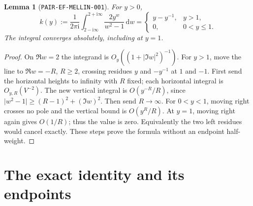 \documentclass[11pt]{article}
\newtheorem{lemma}{Lemma}
\newcommand{\dd}{\,\mathrm d}
\newcommand{\ii}{\mathrm i}
\begin{document}
\begin{lemma}[\texttt{PAIR-EF-MELLIN-001}]\label{lem:ef-mellin}
For \(y>0\),
\begin{equation}\label{eq:mellin}
 k(y):=\frac1{2\pi\ii}\int_{2-\ii\infty}^{2+\ii\infty}
          \frac{2y^w}{w^2-1}\dd w
 =\begin{cases}y-y^{-1},&y>1,\\0,&0<y\leq1.\end{cases}
\end{equation}
The integral converges absolutely, including at \(y=1\).
\end{lemma}
\begin{proof}
On \(\Re w=2\) the integrand is \(O_y((1+|\Im w|^2)^{-1})\).
For \(y>1\), move the line to \(\Re w=-R\), \(R\geq2\),
crossing residues \(y\) and \(-y^{-1}\) at \(1\) and \(-1\).
First send the horizontal heights to infinity with \(R\) fixed;
each horizontal integral is \(O_{y,R}(V^{-2})\). The new vertical
integral is \(O(y^{-R}/R)\), since
\(\lvert w^2-1\rvert\geq(R-1)^2+(\Im w)^2\).
Then send \(R\to\infty\). For \(0<y<1\), moving right crosses
no pole and the vertical bound is \(O(y^R/R)\).
At \(y=1\), moving right again gives \(O(1/R)\); thus the value
is zero. Equivalently the two left residues would cancel exactly.
These steps prove the formula without an endpoint half-weight.
\end{proof}

\section{The exact identity and its endpoints}
\end{document}
